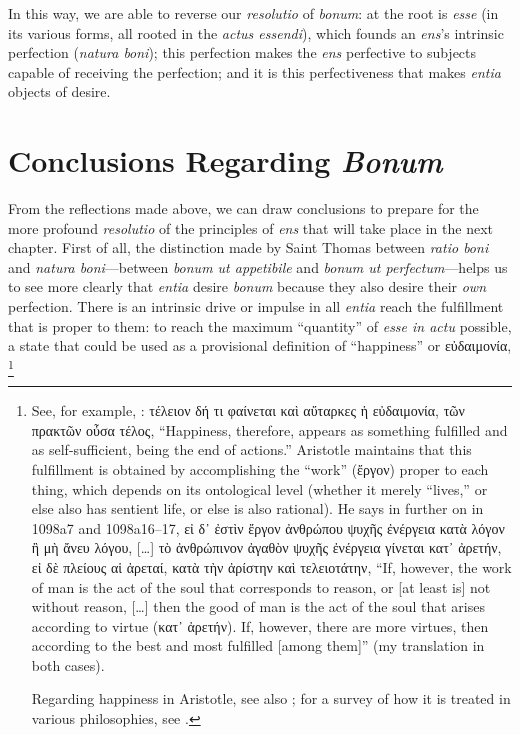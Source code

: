 %
In this way, we are able to reverse our \emph{resolutio} of \emph{bonum}: at the root is \emph{esse} (in its various forms, all rooted in the \emph{actus essendi}), which founds an \emph{ens}’s intrinsic perfection (\emph{natura boni}); this perfection makes the \emph{ens} perfective to subjects capable of receiving the perfection; and it is this perfectiveness that makes \emph{entia} objects of desire.

\section{Conclusions Regarding \emph{Bonum}}

From the reflections made above, we can draw conclusions to prepare for the more profound \emph{resolutio} of the principles of \emph{ens} that will take place in the next chapter. First of all, the distinction made by Saint Thomas between \emph{ratio boni} and \emph{natura boni}—between \emph{bonum ut appetibile} and \emph{bonum ut perfectum}—helps us to see more clearly that \emph{entia} desire \emph{bonum} because they also desire their \emph{own} perfection. There is an intrinsic drive or impulse in all \emph{entia} reach the fulfillment that is proper to them: to reach the maximum “quantity” of \emph{esse in actu} possible, a state that could be used as a provisional definition of “happiness” or εὐδαιμονία,%
%
\footnote{See, for example, \cite[Α, 7]{aristotle:ethics}: τέλειον δή τι φαίνεται καὶ αὔταρκες ἡ εὐδαιμονία, τῶν πρακτῶν οὖσα τέλος, “Happiness, therefore, appears as something fulfilled and as self-sufficient, being the end of actions.” Aristotle maintains that this fulfillment is obtained by accomplishing the “work” (ἔργον) proper to each thing, which depends on its ontological level (whether it merely “lives,” or else also has sentient life, or else is also rational).
He says in further on in 1098a7 and 1098a16–17, εἰ δ᾽ ἐστὶν ἔργον ἀνθρώπου ψυχῆς ἐνέργεια κατὰ λόγον ἢ μὴ ἄνευ λόγου, [\ldots] τὸ ἀνθρώπινον ἀγαθὸν ψυχῆς ἐνέργεια γίνεται κατ᾽ ἀρετήν, εἰ δὲ πλείους αἱ ἀρεταί, κατὰ τὴν ἀρίστην καὶ τελειοτάτην, “If, however, the work of man is the act of the soul that corresponds to reason, or [at least is] not without reason, [\ldots] then the good of man is the act of the soul that arises according to virtue (κατ᾽ ἀρετήν). If, however, there are more virtues, then according to the best and most fulfilled [among them]” (my translation in both cases).

Regarding happiness in Aristotle, see also \cite[203–204]{izquierdo:vita}; for a survey of how it is treated in various philosophies, see \cite[254–275]{millan-puelles:libre}.}

